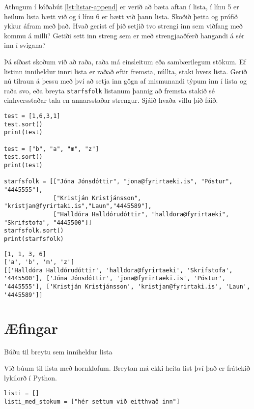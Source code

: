 Athugum í kóðabút \ref{lst:listar-append} er verið að bæta aftan í lista, í línu 5 er heilum lista bætt við og í línu 6 er bætt við þann lista.
Skoðið þetta og prófið ykkur áfram með það.
Hvað gerist ef þið setjið tvo strengi inn sem viðfang með kommu á milli?
Getiði sett inn streng sem er með strengjaaðferð hangandi á sér inn í svigana?

Þá síðast skoðum við að raða, raða má einsleitum eða sambærilegum stökum.
Ef listinn inniheldur innri lista er raðað eftir fremsta, núllta, staki hvers lista.
Gerið nú tilraun á þessu með því að setja inn gögn af mismunandi týpum inn í lista og raða svo, eða breyta \texttt{starfsfolk} listanum þannig að fremsta stakið sé einhversstaðar tala en annarsstaðar strengur.
Sjáið hvaða villu þið fáið.

\begin{lstlisting}[caption=.sort() aðferðin, label=lst:listar-sort]
test = [1,6,3,1]
test.sort()
print(test)

test = ["b", "a", "m", "z"]
test.sort()
print(test)

starfsfolk = [["Jóna Jónsdóttir", "jona@fyrirtaeki.is", "Póstur", "4445555"],
			  ["Kristján Kristjánsson", "kristjan@fyrirtaki.is","Laun","4445589"],
			  ["Halldóra Halldórudóttir", "halldora@fyrirtaeki", "Skrifstofa", "4445500"]]
starfsfolk.sort()
print(starfsfolk)
\end{lstlisting}
\lstset{style=uttak}
\begin{lstlisting}
[1, 1, 3, 6]
['a', 'b', 'm', 'z']
[['Halldóra Halldórudóttir', 'halldora@fyrirtaeki', 'Skrifstofa', '4445500'], ['Jóna Jónsdóttir', 'jona@fyrirtaeki.is', 'Póstur', '4445555'], ['Kristján Kristjánsson', 'kristjan@fyrirtaki.is', 'Laun', '4445589']]
\end{lstlisting}
\lstset{style=venjulegt}

\newpage
\section{Æfingar}
\begin{exercise}\label{lst1}
	Búðu til breytu sem inniheldur lista
\end{exercise}
\begin{Answer}[ref={lst1}]
Við búum til lista með hornklofum.
Breytan má ekki heita list því það er frátekið lykilorð í Python.
\begin{lstlisting}
listi = []
listi_med_stokum = ["hér settum við eitthvað inn"]\end{lstlisting}
\end{Answer}


